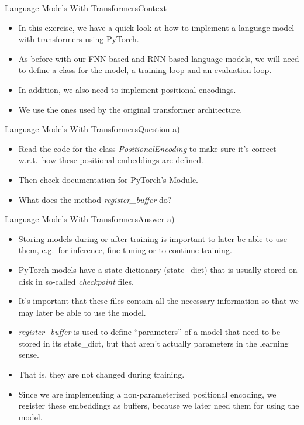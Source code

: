 \documentclass[t]{beamer}
\begin{document}
\begin{frame}{Language Models With Transformers}{Context}
    \begin{itemize}
        \item In this exercise, we have a quick look at how to implement a
              language model with transformers using
              \href{https://pytorch.org/}{PyTorch}.
        \item As before with our FNN-based and RNN-based language models, we
              will need to define a class for the model, a training loop and an
              evaluation loop.
        \item In addition, we also need to implement positional encodings.
        \item We use the ones used by the original transformer architecture.
    \end{itemize}
\end{frame}

\begin{frame}{Language Models With Transformers}{Question a)}
    \begin{itemize}
        \item Read the code for the class \emph{PositionalEncoding} to make sure
              it's correct w.r.t.\ how these positional embeddings are defined.
        \item Then check documentation for PyTorch's
              \href{https://pytorch.org/docs/stable/generated/torch.nn.Module.html}{Module}.
        \item What does the method \emph{register\_buffer} do?
    \end{itemize}
\end{frame}

\begin{frame}{Language Models With Transformers}{Answer a)}
    \begin{itemize}
        \item Storing models during or after training is important to later be
              able to use them, e.g.\ for inference, fine-tuning or to continue
              training.
        \item PyTorch models have a state dictionary (state\_dict) that is
              usually stored on disk in so-called \emph{checkpoint} files.
        \item It's important that these files contain all the necessary
              information so that we may later be able to use the model.
        \item \emph{register\_buffer} is used to define ``parameters'' of a
              model that need to be stored in its state\_dict, but that aren't
              actually parameters in the learning sense.
        \item That is, they are not changed during training.
        \item Since we are implementing a non-parameterized positional encoding,
              we register these embeddings as buffers, because we later need
              them for using the model.
    \end{itemize}
\end{frame}
\end{document}
